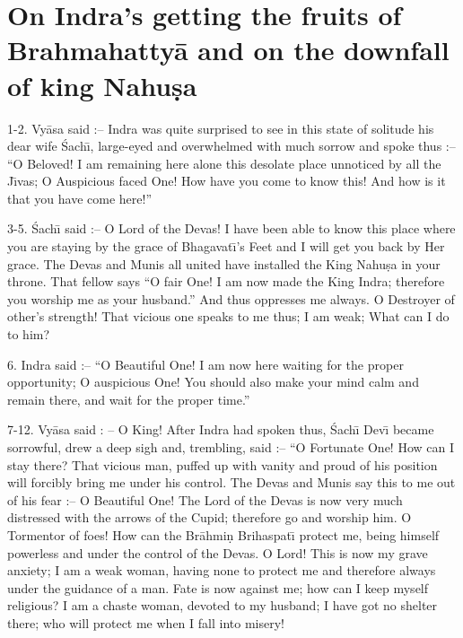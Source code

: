 \chapter{On Indra's getting the fruits of Brahmahatty\=a and on the downfall of king Nahu\d{s}a}

1-2. Vy\=asa said :-- Indra was quite surprised to see in this state of solitude his dear wife \'Sach\={\i}, large-eyed and overwhelmed with much sorrow and spoke thus :-- ``O Beloved! I am remaining here alone this desolate place unnoticed by all the J\={\i}vas; O Auspicious faced One! How have you come to know this! And how is it that you have come here!''

3-5. \'Sach\={\i} said :-- O Lord of the Devas! I have been able to know this place where you are staying by the grace of Bhagavat\={\i}'s Feet and I will get you back by Her grace. The Devas and Munis all united have installed the King Nahu\d{s}a in your throne. That fellow says ``O fair One! I am now made the King Indra; therefore you worship me as your husband.'' And thus oppresses me always. O Destroyer of other's strength! That vicious one speaks to me thus; I am weak; What can I do to him?

6. Indra said :-- ``O Beautiful One! I am now here waiting for the proper opportunity; O auspicious One! You should also make your mind calm and remain there, and wait for the proper time.''

7-12. Vy\=asa said : -- O King! After Indra had spoken thus, \'Sach\={\i} Dev\={\i} became sorrowful, drew a deep sigh and, trembling, said :-- ``O Fortunate One! How can I stay there? That vicious man, puffed up with vanity and proud of his position will forcibly bring me under his control. The Devas and Munis say this to me out of his fear :-- O Beautiful One! The Lord of the Devas is now very much distressed with the arrows of the Cupid; therefore go and worship him. O Tormentor of foes! How can the Br\=ahmi\d{n} Brihaspat\={\i} protect me, being himself powerless and under the control of the Devas. O Lord! This is now my grave anxiety; I am a weak woman, having none to protect me and therefore always under the guidance of a man. Fate is now against me; how can I keep myself religious? I am a chaste woman, devoted to my husband; I have got no shelter there; who will protect me when I fall into misery!

